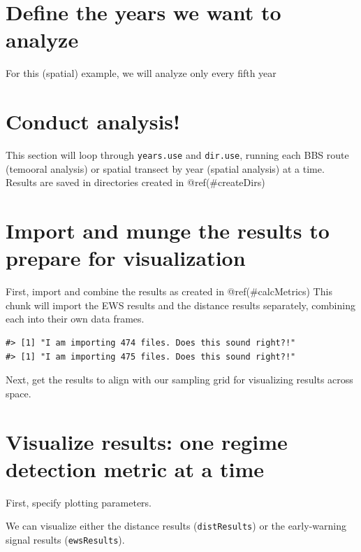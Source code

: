 \documentclass[12pt,twoside,openany]{reedthesis}
\begin{document}
\hypertarget{define-the-years-we-want-to-analyze}{%
\section{Define the years we want to analyze}\label{define-the-years-we-want-to-analyze}}

For this (spatial) example, we will analyze only every fifth year

\hypertarget{conduct-analysis}{%
\section{Conduct analysis!}\label{conduct-analysis}}

This section will loop through \texttt{years.use} and \texttt{dir.use}, running each BBS route (temooral analysis) or spatial transect by year (spatial analysis) at a time. Results are saved in directories created in @ref(\#createDirs)

\hypertarget{import-and-munge-the-results-to-prepare-for-visualization}{%
\section{Import and munge the results to prepare for visualization}\label{import-and-munge-the-results-to-prepare-for-visualization}}

First, import and combine the results as created in @ref(\#calcMetrics)
This chunk will import the EWS results and the distance results separately, combining each into their own data frames.
\begin{verbatim}
#> [1] "I am importing 474 files. Does this sound right?!"
#> [1] "I am importing 475 files. Does this sound right?!"
\end{verbatim}
Next, get the results to align with our sampling grid for visualizing results across space.

\hypertarget{visualize-results-one-regime-detection-metric-at-a-time}{%
\section{Visualize results: one regime detection metric at a time}\label{visualize-results-one-regime-detection-metric-at-a-time}}

First, specify plotting parameters.

We can visualize either the distance results (\texttt{distResults}) or the early-warning signal results (\texttt{ewsResults}).
\end{document}
